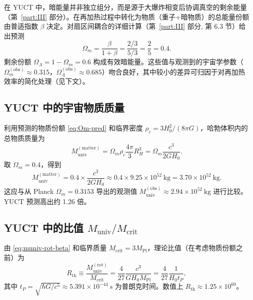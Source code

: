 \documentclass[11pt,a4paper]{article}
\begin{document}
	在 YUCT 中，暗能量并非独立组分，而是源于大爆炸相变后协调真空的剩余能量（第~\ref{part:III} 部分）。在再加热过程中转化为物质（重子+暗物质）的总能量份额由普适指数 \(\beta\) 决定。对扇区间耦合的详细计算（第~\ref{part:III} 部分, 第 6.3 节）给出预测
	\begin{equation}
		\Omega_m = \frac{\beta}{1+\beta} = \frac{2/3}{5/3} = \frac{2}{5} = 0.4.
		\label{eq:Om-pred}
	\end{equation}
	剩余份额 \(\Omega_\Lambda = 1 - \Omega_m = 0.6\) 构成有效暗能量。这些值与观测到的宇宙学参数（\(\Omega_m^{\mathrm{(obs)}} \approx 0.315\)，\(\Omega_\Lambda^{\mathrm{(obs)}} \approx 0.685\)）吻合良好，其中较小的差异可归因于对再加热效率的简化处理（见下文）。
	
	\subsection{YUCT 中的宇宙物质质量}
	
	利用预测的物质份额 \eqref{eq:Om-pred} 和临界密度 \(\rho_c = 3H_0^2/(8\pi G)\)，哈勃体积内的总物质质量为
	\begin{equation}
		M_{\mathrm{univ}}^{\mathrm{(matter)}} = \Omega_m \rho_c \frac{4\pi}{3} R_H^3 = \Omega_m \frac{c^3}{2 G H_0}.
		\label{eq:muniv-matter}
	\end{equation}
	取 \(\Omega_m = 0.4\)，得到
	\[
	M_{\mathrm{univ}}^{\mathrm{(matter)}} = 0.4 \times \frac{c^3}{2 G H_0} \approx 0.4 \times 9.25\times 10^{52}\ \mathrm{kg} = 3.70\times 10^{52}\ \mathrm{kg}.
	\]
	这应与从 Planck \(\Omega_m = 0.3153\) 导出的观测值 \(M_{\mathrm{univ}}^{\mathrm{(obs)}} \approx 2.94\times 10^{52}\ \mathrm{kg}\) 进行比较。YUCT 预测高出约 1.26 倍。
	
	\subsection{YUCT 中的比值 \(M_{\mathrm{univ}} / M_{\mathrm{crit}}\)}
	
	由 \eqref{eq:muniv-rot-beta} 和临界质量 \(M_{\mathrm{crit}} = 3 M_{\mathrm{Pl}}\)，理论比值（在考虑物质份额之前）为
	\begin{equation}
		R_{\mathrm{th}} \equiv \frac{M_{\mathrm{univ}}^{\mathrm{(rot)}}}{M_{\mathrm{crit}}} = \frac{4}{27} \frac{c^3}{G H_0 M_{\mathrm{Pl}}} = \frac{4}{27} \frac{1}{H_0 t_P},
		\label{eq:Rth}
	\end{equation}
	其中 \(t_P = \sqrt{\hbar G / c^5} \approx 5.391\times 10^{-44}\ \mathrm{s}\) 为普朗克时间。数值上 \(R_{\mathrm{th}} \approx 1.25\times 10^{60}\)。
	
\end{document}
